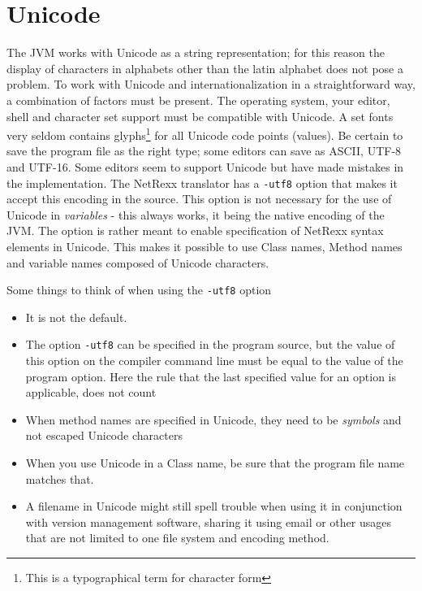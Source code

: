 \chapter{Unicode}
The JVM works with Unicode as a string representation; for this reason the display of characters in alphabets other than the latin alphabet does not pose a problem. To work with Unicode and internationalization in a straightforward way, a combination of factors must be present. The operating system, your editor, shell and character set support must be compatible with Unicode. A set fonts very seldom contains glyphs\footnote{This is a typographical term for character form} for all Unicode code points (values). Be certain to save the program file as the right type; some editors can save as ASCII, UTF-8 and UTF-16. Some editors seem to support Unicode but have made mistakes in the implementation. The NetRexx translator has a \texttt{-utf8} option that makes it accept this encoding in the source. This option is not necessary for the use of Unicode in \emph{variables} - this always works, it being the native encoding of the JVM. The option is rather meant to enable specification of NetRexx syntax elements in Unicode. This makes it possible to use Class names, Method names and variable names composed of Unicode characters.

Some things to think of when using the \texttt{-utf8} option
\begin{itemize}
\item It is not the default.
\item The option \texttt{-utf8} can be specified in the program source, but the value of this option on the compiler command line must be equal to the value of the program option. Here the rule that the last specified value for an option is applicable, does not count
\item When method names are specified in Unicode, they need to be \emph{symbols} and not escaped Unicode characters
\item When you use Unicode in a Class name, be sure that the program file name matches that.
\item A filename in Unicode might still spell trouble when using it in conjunction with version management software, sharing it using email or other usages that are not limited to one file system and encoding method.
\end{itemize}

